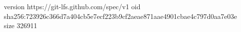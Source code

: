 version https://git-lfs.github.com/spec/v1
oid sha256:723926c366d7a404cb5e7ecf223b9cf2aeae871aae4901cbae4c797d0aa7e03e
size 326911
